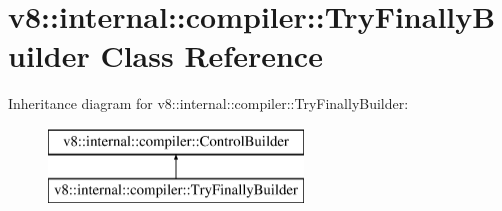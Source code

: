 \hypertarget{classv8_1_1internal_1_1compiler_1_1_try_finally_builder}{}\section{v8\+:\+:internal\+:\+:compiler\+:\+:Try\+Finally\+Builder Class Reference}
\label{classv8_1_1internal_1_1compiler_1_1_try_finally_builder}
Inheritance diagram for v8\+:\+:internal\+:\+:compiler\+:\+:Try\+Finally\+Builder\+:\begin{figure}[H]
\begin{center}
\leavevmode
\includegraphics[height=2.000000cm]{classv8_1_1internal_1_1compiler_1_1_try_finally_builder}
\end{center}
\end{figure}
